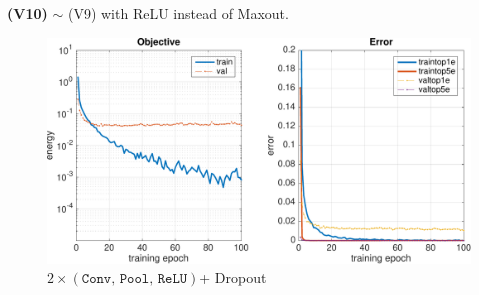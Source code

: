 \documentclass[11pt]{article}
\begin{document}
\textbf{(V10)} $\sim$ (V9) with ReLU instead of Maxout.
	\begin{figure}[H]
	    \centering
	    \includegraphics[width=15cm]{v10}
	    \caption{$2\times(\texttt{Conv, Pool, ReLU})$+ Dropout}
	\end{figure}

\end{document}
